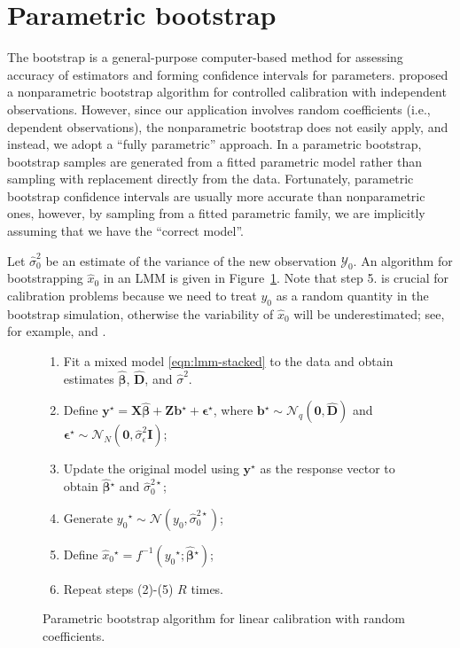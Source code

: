 \documentclass{article}\usepackage[]{graphicx}\usepackage[]{color}
\newcommand{\boot}{\ensuremath{^\star}}
\begin{document}

\section{Parametric bootstrap}\label{sec:boot}

The bootstrap \citep{efron-bootstrap-1979} is a general-purpose computer-based method for assessing accuracy of estimators and forming confidence intervals for parameters.  \citet{jones-bootstrapping-1999} proposed a nonparametric bootstrap algorithm for controlled calibration with independent observations.  However, since our application involves random coefficients (i.e., dependent observations), the nonparametric bootstrap does not easily apply, and instead, we adopt a ``fully parametric'' approach.  In a parametric bootstrap, bootstrap samples are generated from a fitted parametric model rather than sampling with replacement directly from the data.  Fortunately, parametric bootstrap confidence intervals are usually more accurate than nonparametric ones, however, by sampling from a fitted parametric family, we are implicitly assuming that we have the ``correct model''.

Let $\widehat{\sigma}_0^2$ be an estimate of the variance of the new observation $\mathcal{Y}_0$.  An algorithm for bootstrapping $\widehat{x}_0$ in an LMM is given in Figure~\ref{fig:parboot}.  Note that step 5. is crucial for calibration problems because we need to treat $y_0$ as a random quantity in the bootstrap simulation, otherwise the variability of $\widehat{x}_0$ will be underestimated; see, for example, \citet{jones-bootstrapping-1999} and \citet{greenwell-investr-2014}.
\begin{figure}[!htb]
\begin{enumerate}
  \item Fit a mixed model \eqref{eqn:lmm-stacked} to the data and obtain estimates $\widehat{\bm{\beta}}$, $\widehat{\bm{D}}$, and $\widehat{\sigma}^2$.
	\item Define $\bm{y}\boot = \bm{X}\widehat{\bm{\beta}} + \bm{Z}\bm{b}\boot + \bm{\epsilon}\boot$, where $\bm{b}\boot \sim \mathcal{N}_q\left(\bm{0}, \widehat{\bm{D}}\right)$ and $\bm{\epsilon}\boot \sim \mathcal{N}_N\left(\bm{0}, \widehat{\sigma}_\epsilon^2\bm{I}\right)$;
	\item Update the original model using $\bm{y}\boot$ as the response vector to obtain $\widehat{\bm{\beta}}\boot$ and $\widehat{\sigma}_0^{2\star}$;
	\item Generate $y_0\boot \sim \mathcal{N}\left(y_0, \widehat{\sigma}_0^{2\star}\right)$;
	\item Define $\widehat{x}_0\boot = f^{-1}\left(y_0\boot; \widehat{\bm{\beta}}\boot\right)$;
  \item Repeat steps (2)-(5) $R$ times.
\end{enumerate}
\caption{Parametric bootstrap algorithm for linear calibration with random coefficients. \label{fig:parboot}}
\end{figure}
\end{document}
